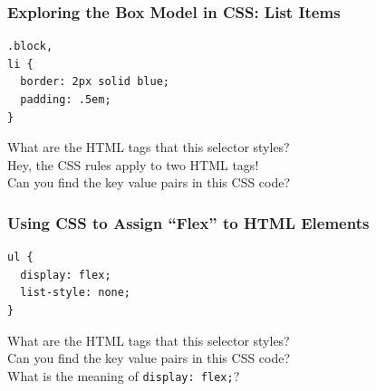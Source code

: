 \documentclass[14pt,aspectratio=169]{beamer}
\begin{document}
%
\begin{frame}[fragile]
  \frametitle{Exploring the Box Model in CSS: List Items}
  \normalsize
  \hspace*{.25in}
  \begin{minipage}{6in}
    \vspace*{.2in}
    \begin{verbatim}
.block,
li {
  border: 2px solid blue;
  padding: .5em;
}
    \end{verbatim}
  \end{minipage}
  \vspace*{.05in}
  \begin{center}
    \noindent What are the HTML tags that this selector styles? \\
    \noindent Hey, the CSS rules apply to two HTML tags! \\
    \noindent Can you find the key value pairs in this CSS code? \\
  \end{center}
\end{frame}

%
\begin{frame}[fragile]
  \frametitle{Using CSS to Assign ``Flex'' to HTML Elements}
  \normalsize
  \hspace*{.25in}
  \begin{minipage}{6in}
    \vspace*{.2in}
    \begin{verbatim}
ul {
  display: flex;
  list-style: none;
}
    \end{verbatim}
  \end{minipage}
  \vspace*{.05in}
  \begin{center}
    \noindent What are the HTML tags that this selector styles? \\
    \noindent Can you find the key value pairs in this CSS code? \\
    \noindent What is the meaning of {\tt display: flex;}? \\
  \end{center}
\end{frame}
\end{document}
